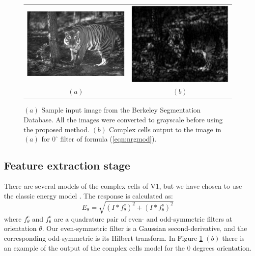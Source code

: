 \documentclass{llncs}
\begin{document}
\begin{figure}[]
	\begin{center}
		\begin{tabular}{cc}
			\includegraphics[width=0.45\linewidth]{./figs/af/esempio} &
			\includegraphics[width=0.45\linewidth]{./figs/af/esempio_fil} \\
			$(a)$ & $(b)$
		\end{tabular}
	\end{center}
  \caption{$(a)$ Sample input image from the Berkeley Segmentation Database.
    All the images were converted to grayscale before using the proposed method.
    $(b)$ Complex cells output to the image in $(a)$ for $0^\circ$ filter of formula (\ref{eqn:nrgmod}).}
	\label{fig:exampleimg}
\end{figure}


\subsection{Feature extraction stage}
\label{sec:ass_feature}
There are several models of the complex cells of V1, but we have chosen to
use the classic energy model \cite{Morrone88}.
The response is calculated as:
\begin{equation} \label{eqn:nrgmod}
E_\theta=\sqrt{\left(I*f^{e}_\theta \right)^2+\left(I*f^{o}_\theta \right)^2}
\end{equation}
where $f^{e}_\theta$ and $f^{o}_\theta$ are a quadrature pair of even- and
odd-symmetric filters at orientation $\theta$. Our even-symmetric filter is
a Gaussian second-derivative, and the corresponding odd-symmetric is its
Hilbert transform.
In Figure \ref{fig:exampleimg} $(b)$ there is an example of the output of the
complex cells model for the $0$ degrees orientation.
\end{document}
